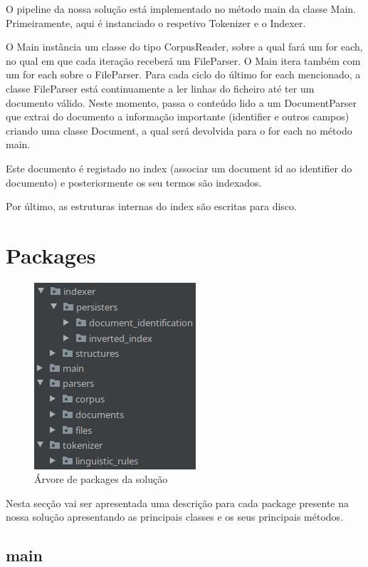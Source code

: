 \documentclass[12pt]{article}
\begin{document}
O pipeline da nossa solução está implementado no método main da classe
Main. Primeiramente, aqui é instanciado o respetivo Tokenizer e o Indexer.

O Main instância um classe do tipo CorpusReader, sobre a qual fará um for each, no
qual em que cada iteração receberá um FileParser. O Main itera também com um
for each sobre o FileParser. Para cada ciclo do último for each mencionado, a classe
FileParser está continuamente a ler linhas do ficheiro até ter um documento
válido. Neste momento, passa o conteúdo lido a um DocumentParser que extrai
do documento a informação importante (identifier e outros campos) criando
uma classe Document, a qual será devolvida para o for each no método main.

Este documento é registado no index (associar um document id ao identifier do
documento) e posteriormente os seu termos são indexados.

Por último, as estruturas internas do index são escritas para disco.

\section{Packages}

\begin{figure}[H]
  \center
  \includegraphics[width=6cm]{packages_all.png}
  \caption{Árvore de packages da solução}
\end{figure}

Nesta secção vai ser apresentada uma descrição para cada package presente na
nossa solução apresentando as principais classes e os seus principais métodos. 

\subsection{main}
\end{document}
